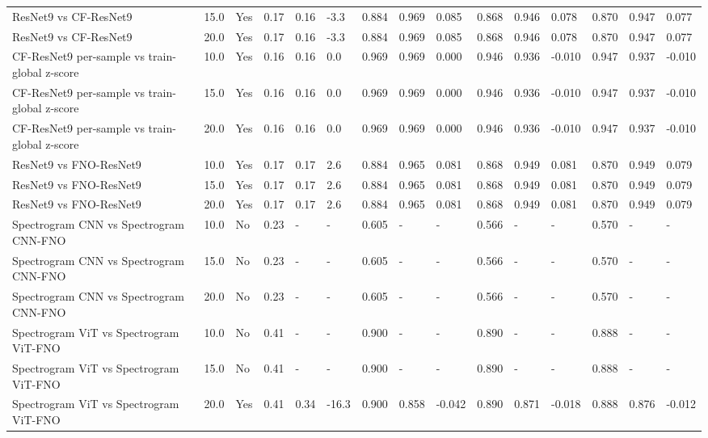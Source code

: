 \begin{longtable}{lllllllllllllll}
ResNet9 vs CF-ResNet9 & 15.0 & Yes & 0.17 & 0.16 & -3.3 & 0.884 & 0.969 & 0.085 & 0.868 & 0.946 & 0.078 & 0.870 & 0.947 & 0.077 \\
ResNet9 vs CF-ResNet9 & 20.0 & Yes & 0.17 & 0.16 & -3.3 & 0.884 & 0.969 & 0.085 & 0.868 & 0.946 & 0.078 & 0.870 & 0.947 & 0.077 \\
CF-ResNet9 per-sample vs train-global z-score & 10.0 & Yes & 0.16 & 0.16 & 0.0 & 0.969 & 0.969 & 0.000 & 0.946 & 0.936 & -0.010 & 0.947 & 0.937 & -0.010 \\
CF-ResNet9 per-sample vs train-global z-score & 15.0 & Yes & 0.16 & 0.16 & 0.0 & 0.969 & 0.969 & 0.000 & 0.946 & 0.936 & -0.010 & 0.947 & 0.937 & -0.010 \\
CF-ResNet9 per-sample vs train-global z-score & 20.0 & Yes & 0.16 & 0.16 & 0.0 & 0.969 & 0.969 & 0.000 & 0.946 & 0.936 & -0.010 & 0.947 & 0.937 & -0.010 \\
ResNet9 vs FNO-ResNet9 & 10.0 & Yes & 0.17 & 0.17 & 2.6 & 0.884 & 0.965 & 0.081 & 0.868 & 0.949 & 0.081 & 0.870 & 0.949 & 0.079 \\
ResNet9 vs FNO-ResNet9 & 15.0 & Yes & 0.17 & 0.17 & 2.6 & 0.884 & 0.965 & 0.081 & 0.868 & 0.949 & 0.081 & 0.870 & 0.949 & 0.079 \\
ResNet9 vs FNO-ResNet9 & 20.0 & Yes & 0.17 & 0.17 & 2.6 & 0.884 & 0.965 & 0.081 & 0.868 & 0.949 & 0.081 & 0.870 & 0.949 & 0.079 \\
Spectrogram CNN vs Spectrogram CNN-FNO & 10.0 & No & 0.23 & - & - & 0.605 & - & - & 0.566 & - & - & 0.570 & - & - \\
Spectrogram CNN vs Spectrogram CNN-FNO & 15.0 & No & 0.23 & - & - & 0.605 & - & - & 0.566 & - & - & 0.570 & - & - \\
Spectrogram CNN vs Spectrogram CNN-FNO & 20.0 & No & 0.23 & - & - & 0.605 & - & - & 0.566 & - & - & 0.570 & - & - \\
Spectrogram ViT vs Spectrogram ViT-FNO & 10.0 & No & 0.41 & - & - & 0.900 & - & - & 0.890 & - & - & 0.888 & - & - \\
Spectrogram ViT vs Spectrogram ViT-FNO & 15.0 & No & 0.41 & - & - & 0.900 & - & - & 0.890 & - & - & 0.888 & - & - \\
Spectrogram ViT vs Spectrogram ViT-FNO & 20.0 & Yes & 0.41 & 0.34 & -16.3 & 0.900 & 0.858 & -0.042 & 0.890 & 0.871 & -0.018 & 0.888 & 0.876 & -0.012 \\
\end{longtable}
